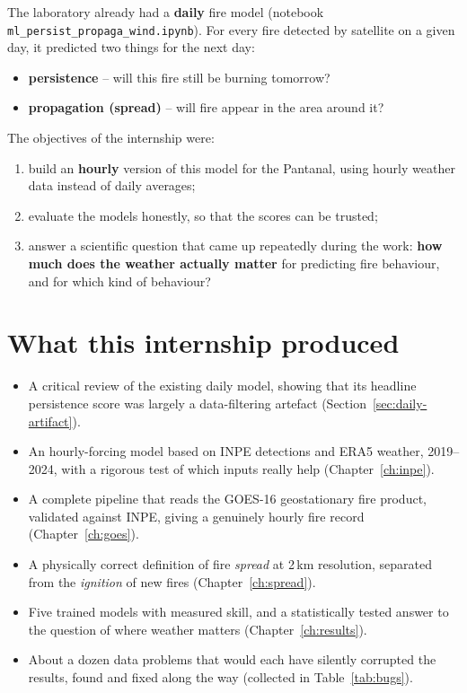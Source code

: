 \documentclass[11pt,a4paper,oneside]{report}
\newcommand{\code}[1]{\texttt{\small #1}}
\begin{document}
The laboratory already had a \textbf{daily} fire model (notebook
\code{ml\_persist\_propaga\_wind.ipynb}). For every fire detected by satellite on
a given day, it predicted two things for the next day:
\begin{itemize}
  \item \textbf{persistence} -- will this fire still be burning tomorrow?
  \item \textbf{propagation (spread)} -- will fire appear in the area around it?
\end{itemize}

The objectives of the internship were:
\begin{enumerate}
  \item build an \textbf{hourly} version of this model for the Pantanal, using
        hourly weather data instead of daily averages;
  \item evaluate the models honestly, so that the scores can be trusted;
  \item answer a scientific question that came up repeatedly during the work:
        \textbf{how much does the weather actually matter} for predicting fire
        behaviour, and for which kind of behaviour?
\end{enumerate}

\section{What this internship produced}

\begin{itemize}
  \item A critical review of the existing daily model, showing that its headline
        persistence score was largely a data-filtering artefact
        (Section~\ref{sec:daily-artifact}).
  \item An hourly-forcing model based on INPE detections and ERA5 weather,
        2019--2024, with a rigorous test of which inputs really help
        (Chapter~\ref{ch:inpe}).
  \item A complete pipeline that reads the GOES-16 geostationary fire product,
        validated against INPE, giving a genuinely hourly fire record
        (Chapter~\ref{ch:goes}).
  \item A physically correct definition of fire \emph{spread} at 2\,km
        resolution, separated from the \emph{ignition} of new fires
        (Chapter~\ref{ch:spread}).
  \item Five trained models with measured skill, and a statistically tested
        answer to the question of where weather matters
        (Chapter~\ref{ch:results}).
  \item About a dozen data problems that would each have silently corrupted the
        results, found and fixed along the way (collected in
        Table~\ref{tab:bugs}).
\end{itemize}
\end{document}
